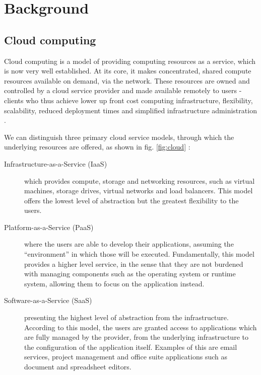 \chapter{Background}

\section{Cloud computing}

Cloud computing is a model of providing computing resources as a service, which
is now very well established. At its core, it makes concentrated, shared compute
resources available on demand, via the network. These resources are owned and
controlled by a cloud service provider and made available remotely to users -
clients who thus achieve lower up front cost computing infrastructure,
flexibility, scalability, reduced deployment times and simplified infrastructure
administration \cite{wiki:cloud}.

We can distinguish three primary cloud service models, through which the
underlying resources are offered, as shown in fig. \ref{fig:cloud}
\cite{nist-cloud}:
\begin{description}
    \item[Infrastructure-as-a-Service (IaaS)] which provides compute, storage
          and networking resources, such as virtual machines, storage drives,
          virtual networks and load balancers. This model offers the lowest
          level of abstraction but the greatest flexibility to the users.
    \item[Platform-as-a-Service (PaaS)] where the users are able to develop
          their applications, assuming the ``environment'' in which those will
          be executed. Fundamentally, this model provides a higher level
          service, in the sense that they are not burdened with managing
          components such as the operating system or runtime system, allowing
          them to focus on the application instead.
    \item[Software-as-a-Service (SaaS)] presenting the highest level of
          abstraction from the infrastructure. According to this model, the
          users are granted access to applications which are fully managed by
          the provider, from the underlying infrastructure to the configuration
          of the application itself. Examples of this are email services,
          project management and office suite applications such as document and
            spreadsheet editors.
\end{description}

